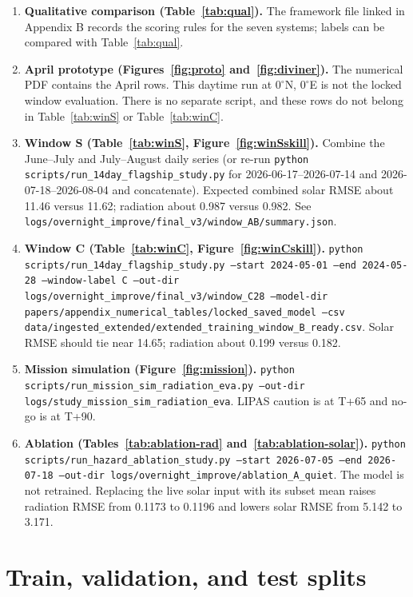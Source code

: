 \begin{enumerate}
\item \textbf{Qualitative comparison (Table~\ref{tab:qual}).} The framework file linked in Appendix B records the scoring rules for the seven systems; labels can be compared with Table~\ref{tab:qual}.
\item \textbf{April prototype (Figures~\ref{fig:proto} and~\ref{fig:diviner}).} The numerical PDF contains the April rows. This daytime run at $0^{\circ}$N, $0^{\circ}$E is not the locked window evaluation. There is no separate script, and these rows do not belong in Table~\ref{tab:winS} or Table~\ref{tab:winC}.
\item \textbf{Window S (Table~\ref{tab:winS}, Figure~\ref{fig:winSskill}).} Combine the June--July and July--August daily series (or re-run \texttt{python scripts/run\_14day\_flagship\_study.py} for 2026-06-17--2026-07-14 and 2026-07-18--2026-08-04 and concatenate). Expected combined solar RMSE about 11.46 versus 11.62; radiation about 0.987 versus 0.982. See \texttt{logs/overnight\_improve/final\_v3/window\_AB/summary.json}.
\item \textbf{Window C (Table~\ref{tab:winC}, Figure~\ref{fig:winCskill}).} \texttt{python scripts/run\_14day\_flagship\_study.py --start 2024-05-01 --end 2024-05-28 --window-label C --out-dir logs/overnight\_improve/final\_v3/window\_C28 --model-dir papers/appendix\_numerical\_tables/locked\_saved\_model --csv data/ingested\_extended/extended\_training\_window\_B\_ready.csv}. Solar RMSE should tie near 14.65; radiation about 0.199 versus 0.182.
\item \textbf{Mission simulation (Figure~\ref{fig:mission}).} \texttt{python scripts/run\_mission\_sim\_radiation\_eva.py --out-dir logs/study\_mission\_sim\_radiation\_eva}. LIPAS caution is at T+65 and no-go is at T+90.
\item \textbf{Ablation (Tables~\ref{tab:ablation-rad} and~\ref{tab:ablation-solar}).} \texttt{python scripts/run\_hazard\_ablation\_study.py --start 2026-07-05 --end 2026-07-18 --out-dir logs/overnight\_improve/ablation\_A\_quiet}. The model is not retrained. Replacing the live solar input with its subset mean raises radiation RMSE from 0.1173 to 0.1196 and lowers solar RMSE from 5.142 to 3.171.
\end{enumerate}

\section{Train, validation, and test splits}
\label{app:splits}

